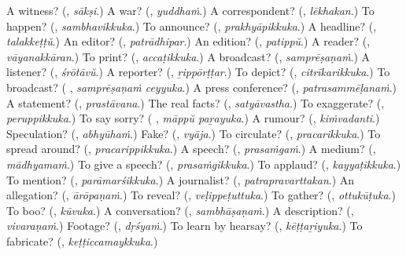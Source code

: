 \begin{tcolorbox}[breakable,colback=teal!4,colframe=teal!35!black,title={Before you move on}]
A witness? (\textbf{}, \emph{sākṣi}.) A war? (\textbf{}, \emph{yuddhaṁ}.) A correspondent? (\textbf{}, \emph{lēkhakan}.) To happen? (\textbf{}, \emph{sambhavikkuka}.) To announce? (\textbf{}, \emph{prakhyāpikkuka}.) A headline? (\textbf{}, \emph{talakkeṭṭŭ}.) An editor? (\textbf{}, \emph{patrādhipar}.) An edition? (\textbf{}, \emph{patippŭ}.) A reader? (\textbf{}, \emph{vāyanakkāran}.) To print? (\textbf{}, \emph{accaṭikkuka}.) A broadcast? (\textbf{}, \emph{samprēṣaṇaṁ}.) A listener? (\textbf{}, \emph{śrōtāvŭ}.) A reporter? (\textbf{}, \emph{ṟippōrṭṭar}.) To depict? (\textbf{}, \emph{citrīkarikkuka}.) To broadcast? (\textbf{ }, \emph{samprēṣaṇaṁ ceyyuka}.) A press conference? (\textbf{}, \emph{patrasammēḷanaṁ}.) A statement? (\textbf{}, \emph{prastāvana}.) The real facts? (\textbf{}, \emph{satyāvastha}.) To exaggerate? (\textbf{}, \emph{peruppikkuka}.) To say sorry? (\textbf{ }, \emph{māppŭ paṟayuka}.) A rumour? (\textbf{}, \emph{kiṁvadanti}.) Speculation? (\textbf{}, \emph{abhyūhaṁ}.) Fake? (\textbf{}, \emph{vyāja}.) To circulate? (\textbf{}, \emph{pracarikkuka}.) To spread around? (\textbf{}, \emph{pracarippikkuka}.) A speech? (\textbf{}, \emph{prasaṁgaṁ}.) A medium? (\textbf{}, \emph{mādhyamaṁ}.) To give a speech? (\textbf{}, \emph{prasaṁgikkuka}.) To applaud? (\textbf{}, \emph{kayyaṭikkuka}.) To mention? (\textbf{}, \emph{parāmarśikkuka}.) A journalist? (\textbf{}, \emph{patrapravarttakan}.) An allegation? (\textbf{}, \emph{ārōpaṇaṁ}.) To reveal? (\textbf{}, \emph{veḷippeṭuttuka}.) To gather? (\textbf{}, \emph{ottukūṭuka}.) To boo? (\textbf{}, \emph{kūvuka}.) A conversation? (\textbf{}, \emph{sambhāṣaṇaṁ}.) A description? (\textbf{}, \emph{vivaraṇaṁ}.) Footage? (\textbf{}, \emph{dṛśyaṁ}.) To learn by hearsay? (\textbf{}, \emph{kēṭṭaṟiyuka}.) To fabricate? (\textbf{}, \emph{keṭṭiccamaykkuka}.)
\end{tcolorbox}
